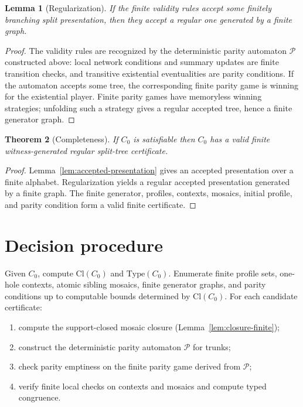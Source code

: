 \documentclass[11pt]{article}
\newcommand{\Cl}{\mathrm{Cl}}
\newtheorem{theorem}{Theorem}[section]
\newtheorem{lemma}[theorem]{Lemma}
\begin{document}
\begin{lemma}[Regularization]
If the finite validity rules accept some finitely branching split presentation,
then they accept a regular one generated by a finite graph.
\end{lemma}

\begin{proof}
The validity rules are recognized by the deterministic parity automaton
$\mathcal{P}$ constructed above: local network conditions and summary updates
are finite transition checks, and transitive existential eventualities are
parity conditions. If the automaton accepts some tree, the corresponding
finite parity game is winning for the existential player. Finite parity games
have memoryless winning strategies; unfolding such a strategy gives a regular
accepted tree, hence a finite generator graph.
\end{proof}

\begin{theorem}[Completeness]
If $C_0$ is satisfiable then $C_0$ has a valid finite witness-generated
regular split-tree certificate.
\end{theorem}

\begin{proof}
Lemma~\ref{lem:accepted-presentation} gives an accepted presentation over a
finite alphabet. Regularization yields a regular accepted presentation
generated by a finite graph. The finite generator, profiles, contexts, mosaics,
initial profile, and parity condition form a valid finite certificate.
\end{proof}

\section{Decision procedure}
\label{sec:decision}

Given $C_0$, compute $\Cl(C_0)$ and $\mathrm{Type}(C_0)$. Enumerate finite
profile sets, one-hole contexts, atomic sibling mosaics, finite generator
graphs, and parity conditions up to computable bounds determined by $\Cl(C_0)$.
For each candidate certificate:
\begin{enumerate}
  \item compute the support-closed mosaic closure (Lemma~\ref{lem:closure-finite});
  \item construct the deterministic parity automaton $\mathcal{P}$ for trunks;
  \item check parity emptiness on the finite parity game derived from $\mathcal{P}$;
  \item verify finite local checks on contexts and mosaics and compute typed congruence.
\end{enumerate}
\end{document}
